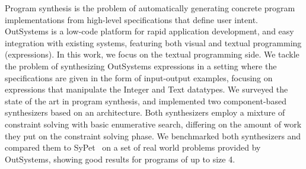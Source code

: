 Program synthesis is the problem of automatically generating concrete program
implementations from high-level specifications that define user intent.
OutSystems is a low-code platform for rapid application development,
and easy integration with existing systems, featuring both visual and
textual programming (expressions).
In this work, we focus on the textual programming side.
We tackle the problem of synthesizing OutSystems expressions in a setting where
the specifications are given in the form of input-output examples, focusing on
expressions that manipulate the Integer and Text datatypes.
We surveyed the state of the art in program synthesis, and implemented two
component-based  synthesizers based on an 
architecture.
Both synthesizers employ a mixture of constraint solving with basic enumerative
search, differing on the amount of work they put on the constraint solving
phase.
We benchmarked both synthesizers and compared them to
SyPet~\cite{Feng:2017:CSC} on a set of real world problems provided by
OutSystems, showing good results for programs of up to size 4.